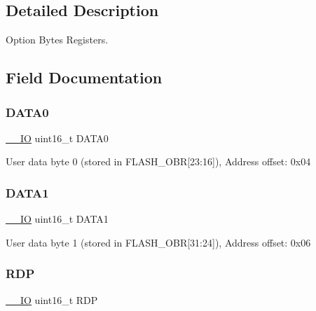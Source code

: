 \subsection{Detailed Description}
Option Bytes Registers. 

\subsection{Field Documentation}
\mbox{\label{struct_o_b___type_def_ac91ac63aaf885d7290d9903fc5bd9515}} 
\subsubsection{\texorpdfstring{D\+A\+T\+A0}{DATA0}}
{\footnotesize\ttfamily \hyperlink{core__sc300_8h_aec43007d9998a0a0e01faede4133d6be}{\+\_\+\+\_\+\+IO} uint16\+\_\+t D\+A\+T\+A0}

User data byte 0 (stored in F\+L\+A\+S\+H\+\_\+\+O\+BR\mbox{[}23\+:16\mbox{]}), Address offset\+: 0x04 \mbox{\label{struct_o_b___type_def_a4fc75d06d435365a28ac018fdc0730cf}} 
\subsubsection{\texorpdfstring{D\+A\+T\+A1}{DATA1}}
{\footnotesize\ttfamily \hyperlink{core__sc300_8h_aec43007d9998a0a0e01faede4133d6be}{\+\_\+\+\_\+\+IO} uint16\+\_\+t D\+A\+T\+A1}

User data byte 1 (stored in F\+L\+A\+S\+H\+\_\+\+O\+BR\mbox{[}31\+:24\mbox{]}), Address offset\+: 0x06 \mbox{\label{struct_o_b___type_def_ae708f301b866ad2a81ed39efba639aab}} 
\subsubsection{\texorpdfstring{R\+DP}{RDP}}
{\footnotesize\ttfamily \hyperlink{core__sc300_8h_aec43007d9998a0a0e01faede4133d6be}{\+\_\+\+\_\+\+IO} uint16\+\_\+t R\+DP}

